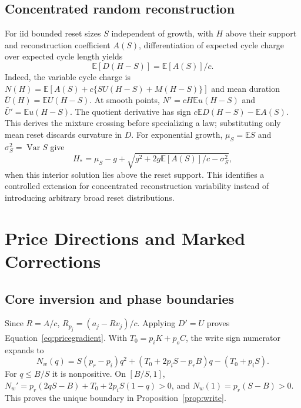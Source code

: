 \documentclass[sigconf,screen,nonacm]{acmart}
\newcommand{\E}{\mathbb{E}}
\begin{document}
\subsection{Concentrated random reconstruction}
For iid bounded reset sizes $S$ independent of growth, with $H$ above their
support and reconstruction coefficient $A(S)$, differentiation of expected
cycle charge over expected cycle length yields
\begin{equation}
\E[D(H-S)]=\E[A(S)]/c.
\end{equation}
Indeed, the variable cycle charge is
$N(H)=\E[A(S)+c\{S U(H-S)+M(H-S)\}]$ and mean duration
$\bar U(H)=\E U(H-S)$. At smooth points,
$N'=cH\E u(H-S)$ and $\bar U'=\E u(H-S)$.
The quotient derivative has sign $c\E D(H-S)-\E A(S)$.
This derives the mixture crossing before specializing a law; substituting
only mean reset discards curvature in $D$.
For exponential growth, $\mu_S=\E S$ and $\sigma_S^2=\operatorname{Var}S$ give
\begin{equation}
H_* =\mu_S-g+\sqrt{g^2+2g\E[A(S)]/c-\sigma_S^2},
\end{equation}
when this interior solution lies above the reset support. This identifies a
controlled extension for concentrated reconstruction variability instead of
introducing arbitrary broad reset distributions.

\section{Price Directions and Marked Corrections}
\label{app:prices}

\subsection{Core inversion and phase boundaries}
Since $R=A/c$, $R_{p_j}=(a_j-Rv_j)/c$. Applying $D'=U$ proves
Equation~\eqref{eq:pricegradient}. With $T_0=p_iK+p_oC$, the write sign
numerator expands to
\begin{equation}
N_w(q)=S(p_r-p_i)q^2+(T_0+2p_iS-p_rB)q-(T_0+p_iS).
\end{equation}
For $q\le B/S$ it is nonpositive. On $[B/S,1]$,
$N_w'=p_r(2qS-B)+T_0+2p_iS(1-q)>0$, and
$N_w(1)=p_r(S-B)>0$. This proves the unique boundary in
Proposition~\ref{prop:write}.
\end{document}
